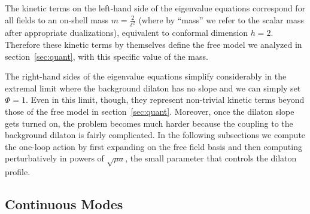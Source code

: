 \documentclass[12pt]{article}
\begin{document}
The kinetic terms on the left-hand side of the eigenvalue equations correspond for all fields to an on-shell mass $m = \frac{2}{\ell^2}$ (where by ``mass'' we refer to the scalar mass after appropriate dualizations), equivalent to conformal dimension $h = 2$. Therefore these kinetic terms by themselves define the free model we analyzed in section~\ref{sec:quant}, with this specific value of the mass. 

The right-hand sides of the eigenvalue equations simplify considerably in the extremal limit where the background dilaton has no slope and we can simply set $\Phi = 1$. Even in this limit, though, they represent non-trivial kinetic terms beyond those of the free model in section~\ref{sec:quant}. Moreover, once the dilaton slope gets turned on, the problem becomes much harder because the coupling to the background dilaton is fairly complicated. In the following subsections we compute the one-loop action by first expanding on the free field basis and then computing perturbatively in powers of $\sqrt{\mu a}$, the small parameter that controls the dilaton profile.



\subsection{Continuous Modes}
\label{sec:oneloop:cont}
\end{document}
